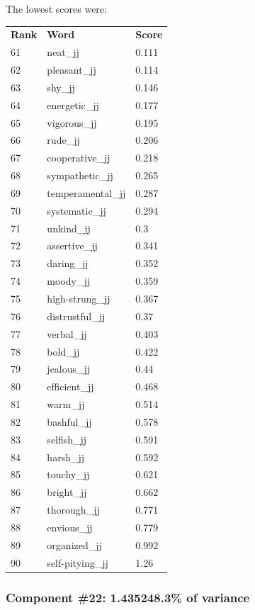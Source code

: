 \documentclass[10pt,letterpaper]{book}
\begin{document}
The lowest scores were:
\begin{tabular}{ l l l }
        \textbf{Rank} & \textbf{Word} & \textbf{Score} \\
        61 & neat\_jj & 0.111 \\
        62 & pleasant\_jj & 0.114 \\
        63 & shy\_jj & 0.146 \\
        64 & energetic\_jj & 0.177 \\
        65 & vigorous\_jj & 0.195 \\
        66 & rude\_jj & 0.206 \\
        67 & cooperative\_jj & 0.218 \\
        68 & sympathetic\_jj & 0.265 \\
        69 & temperamental\_jj & 0.287 \\
        70 & systematic\_jj & 0.294 \\
        71 & unkind\_jj & 0.3 \\
        72 & assertive\_jj & 0.341 \\
        73 & daring\_jj & 0.352 \\
        74 & moody\_jj & 0.359 \\
        75 & high-strung\_jj & 0.367 \\
        76 & distrustful\_jj & 0.37 \\
        77 & verbal\_jj & 0.403 \\
        78 & bold\_jj & 0.422 \\
        79 & jealous\_jj & 0.44 \\
        80 & efficient\_jj & 0.468 \\
        81 & warm\_jj & 0.514 \\
        82 & bashful\_jj & 0.578 \\
        83 & selfish\_jj & 0.591 \\
        84 & harsh\_jj & 0.592 \\
        85 & touchy\_jj & 0.621 \\
        86 & bright\_jj & 0.662 \\
        87 & thorough\_jj & 0.771 \\
        88 & envious\_jj & 0.779 \\
        89 & organized\_jj & 0.992 \\
        90 & self-pitying\_jj & 1.26 \\
\end{tabular}
\subsubsection{Component \#22: 1.435248.3\% of variance}
\end{document}
